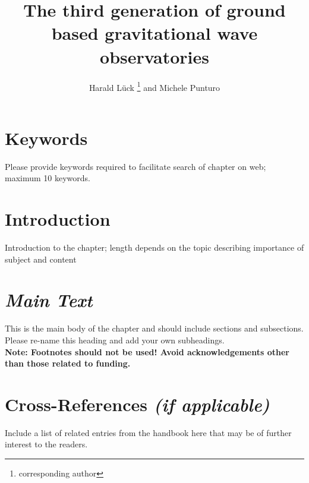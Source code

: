 \documentclass[graybox, nosecnum]{svmult}
\begin{document}
\title*{The third generation of ground based gravitational wave observatories}
\author{Harald Lück \thanks{corresponding author} and Michele Punturo}
%
%
\maketitle
%
\section{Keywords} 
Please provide keywords required to facilitate search of chapter on web; maximum 10 keywords.
\section{Introduction}
Introduction to the chapter; length depends on the topic describing importance of subject and content

\section{\textit{Main Text}}
This is the main body of the chapter and should include sections and subsections. Please re-name this heading and add your own subheadings.\\
{\bf Note: Footnotes should not be used! Avoid acknowledgements other than those related to funding.}
\section{Cross-References \textit{(if applicable)}}
Include a list of related entries from the handbook here that may be of further interest to the readers.
\end{document}

